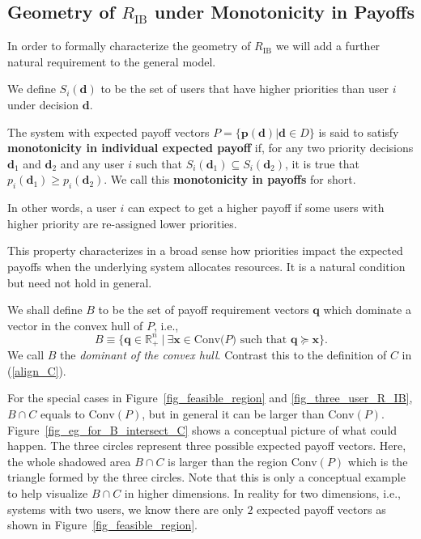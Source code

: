 \documentclass[prodmode,acmtompecs]{acmsmall}
\newcommand{\reqvec}{\mathbf{q}}
\newcommand{\priorityImplication}{monotonicity in individual expected payoff}
\newcommand{\myComments}[1]{}
\newif\ifdissertation
\newcommand{\dissertationStart}{\ifdissertation  \myComments{Dissertation version: }}
\newcommand{\commentEnd}{\myComments{End}}
\begin{document}
\subsection{Geometry of $R_{\text{IB}}$ under Monotonicity in Payoffs}
\label{subsection_characterizing_R_IB}

In order to formally characterize the geometry of $R_{\text{IB}}$ we will add a further natural requirement to the general model. 


We define $S_i(\mathbf{d})$ to be the set of users that have higher priorities than user $i$ under decision $\mathbf{d}$. 

\begin{definition}
The system with expected payoff vectors $P = \{\mathbf{p}(\mathbf{d}) | \mathbf{d} \in D \}$ is said to satisfy {\bf \priorityImplication} if, for any two priority decisions $\mathbf{d}_1$ and $\mathbf{d}_2$ and any user $i$ such that $S_i(\mathbf{d}_1) \subseteq S_i(\mathbf{d}_2)$, it is true that $p_i(\mathbf{d}_1) \geq p_i(\mathbf{d}_2)$. We call this {\bf monotonicity in payoffs} for short. 
\end{definition}

In other words, a user $i$ can expect to get a higher payoff if some users with higher priority are re-assigned lower priorities. 
\dissertationStart
Note we are not comparing the expected payoffs of different users since payoffs can be defined in different ways for different users and may not be comparable. 
\commentEnd\fi
This property characterizes in a broad sense how priorities impact the expected payoffs when the underlying system allocates resources. 
It is a natural condition but need not hold in general. 

We shall define $B$ to be the set of payoff requirement vectors $\reqvec$ which dominate a vector in the convex hull of $P$, i.e., 
$$
B \equiv \{ \reqvec \in \mathbb R_+^n ~|~ \exists \mathbf{x} \in \text{Conv($P$)} \text{ such that } \reqvec \succeq \mathbf{x} \}. 
$$
We call $B$ the {\em dominant of the convex hull}. Contrast this to the definition of $C$ in (\ref{align_C}). 

For the special cases in Figure~{\ref{fig_feasible_region}} and \ref{fig_three_user_R_IB}, $B \cap C$ equals to $\text{Conv}(P)$, but in general it can be larger than $\text{Conv}(P)$. Figure~{\ref{fig_eg_for_B_intersect_C}} shows a conceptual picture of what could happen. The three circles represent three possible expected payoff vectors. Here, the whole shadowed area $B \cap C$ is larger than the region Conv$(P)$ which is the triangle formed by the three circles. 
Note that this is only a conceptual example to help visualize $B\cap C$ in higher dimensions. In reality for two dimensions, i.e., systems with two users, we know there are only $2$ expected payoff vectors as shown in Figure~{\ref{fig_feasible_region}}. 
\end{document}
